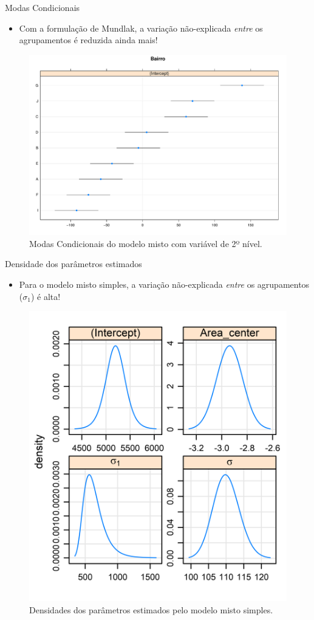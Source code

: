 \documentclass[9pt,ignorenonframetext,aspectratio=169]{beamer}
\providecommand{\tightlist}{%
  \setlength{\itemsep}{0pt}\setlength{\parskip}{0pt}}
\begin{document}
\begin{frame}{Modas Condicionais}
\protect\hypertarget{modas-condicionais-2}{}

\begin{itemize}[<+->]
\tightlist
\item
  Com a formulação de Mundlak, a variação não-explicada \emph{entre} os
  agrupamentos é reduzida ainda mais!
\end{itemize}

\begin{figure}

{\centering \includegraphics[width=0.6\linewidth]{index_files/figure-beamer/unnamed-chunk-12-1} 

}

\caption{Modas Condicionais do modelo misto com variável de 2º nível.}\label{fig:unnamed-chunk-12}
\end{figure}

\end{frame}

\begin{frame}{Densidade dos parâmetros estimados}
\protect\hypertarget{densidade-dos-paruxe2metros-estimados}{}

\begin{itemize}[<+->]
\tightlist
\item
  Para o modelo misto simples, a variação não-explicada \emph{entre} os
  agrupamentos (\(\sigma_1\)) é alta!
\end{itemize}

\begin{figure}

{\centering \includegraphics[width=0.4\linewidth]{../../images/pr-1} 

}

\caption{Densidades dos parâmetros estimados pelo modelo misto simples.}\label{fig:unnamed-chunk-13}
\end{figure}

\end{frame}
\end{document}
